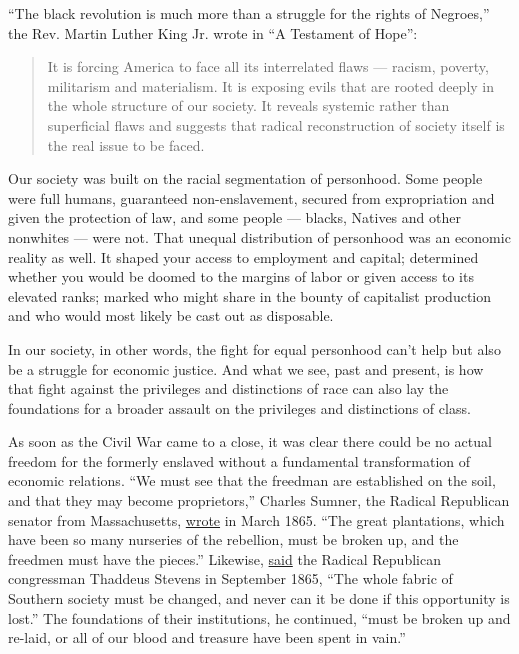 ``The black revolution is much more than a struggle for the rights of
Negroes,'' the Rev. Martin Luther King Jr. wrote in ``A Testament of
Hope'':

\begin{quote}
It is forcing America to face all its interrelated flaws --- racism,
poverty, militarism and materialism. It is exposing evils that are
rooted deeply in the whole structure of our society. It reveals systemic
rather than superficial flaws and suggests that radical reconstruction
of society itself is the real issue to be faced.
\end{quote}

Our society was built on the racial segmentation of personhood. Some
people were full humans, guaranteed non-enslavement, secured from
expropriation and given the protection of law, and some people ---
blacks, Natives and other nonwhites --- were not. That unequal
distribution of personhood was an economic reality as well. It shaped
your access to employment and capital; determined whether you would be
doomed to the margins of labor or given access to its elevated ranks;
marked who might share in the bounty of capitalist production and who
would most likely be cast out as disposable.

In our society, in other words, the fight for equal personhood can't
help but also be a struggle for economic justice. And what we see, past
and present, is how that fight against the privileges and distinctions
of race can also lay the foundations for a broader assault on the
privileges and distinctions of class.

As soon as the Civil War came to a close, it was clear there could be no
actual freedom for the formerly enslaved without a fundamental
transformation of economic relations. ``We must see that the freedman
are established on the soil, and that they may become proprietors,''
Charles Sumner, the Radical Republican senator from Massachusetts,
\href{https://www.google.com/books/edition/Black_Reconstruction_in_America/DmymDwAAQBAJ?hl=en\&gbpv=1\&dq=black\%20reconstruction\&pg=PA177\&printsec=frontcover\&bsq=\%E2\%80\%9Cwe\%20must\%20see\%20that\%20the\%20freedmen\%E2\%80\%9D}{wrote}
in March 1865. ``The great plantations, which have been so many
nurseries of the rebellion, must be broken up, and the freedmen must
have the pieces.'' Likewise,
\href{https://www.google.com/books/edition/Black_Reconstruction_in_America/DmymDwAAQBAJ?hl=en\&gbpv=1\&dq=black\%20reconstruction\&pg=PA176\&printsec=frontcover\&bsq=\%E2\%80\%9Cspent\%20in\%20vain\%E2\%80\%9D}{said}
the Radical Republican congressman Thaddeus Stevens in September 1865,
``The whole fabric of Southern society must be changed, and never can it
be done if this opportunity is lost.'' The foundations of their
institutions, he continued, ``must be broken up and re-laid, or all of
our blood and treasure have been spent in vain.''

